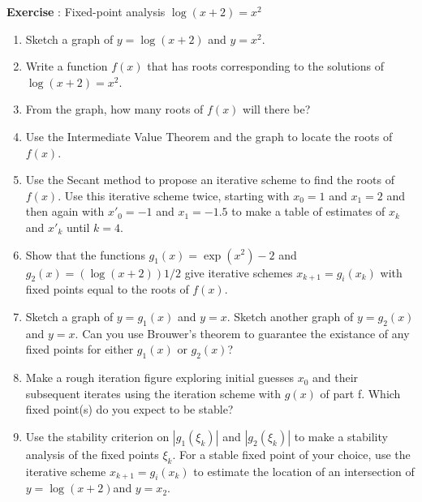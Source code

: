 \documentclass[a4paper,12pt,openany,notitlepage]{book}
\newcounter{num_exercice}
\newcommand{\exercice}
    {   \par
        \stepcounter{num_exercice}%
        \noindent
        \textbf{Exercise \arabic{num_exercice}}:
        \quad
    }
\begin{document}
\exercice{Fixed-point analysis $\log(x+2)=x^2$}
\begin{enumerate}[label=\alph*)]
	\item Sketch a graph of $y=\log(x+2)$ and $y=x^2$. 
	
	\item Write a function $f(x)$ that has roots corresponding to the solutions of $\log(x+2)=x^2$.
	
	\item From the graph, how many roots of $f(x)$ will there be?
	
	\item Use the Intermediate Value Theorem and the graph to locate the roots of $f(x)$.
	
	\item Use the Secant method to propose an iterative scheme to find the roots of $f(x)$. Use this iterative scheme twice, starting with $x_0=1$ and $x_1=2$ and then again with $x'_0=-1$ and $x_1=-1.5$ to make a table of estimates of $x_k$ and $x'_k$ until $k=4$.
	
	\item Show that the functions $g_1(x)=\exp(x^2)-2$ and $g_2(x)=( \log(x+2) )1/2$ give iterative schemes $x_{k+1} = g_i(x_k)$ with fixed points equal to the roots of $f(x)$.
	
	\item Sketch a graph of $y=g_1(x)$ and $y=x$. Sketch another graph of $y=g_2(x)$ and $y=x$. Can you use Brouwer's theorem to guarantee the existance of any fixed points for either $g_1(x)$ or $g_2(x)$?
	
	\item Make a rough iteration figure exploring initial guesses $x_0$ and their subsequent iterates using the iteration scheme with $g(x)$ of part f. Which fixed point(s) do you expect to be stable?
	
	\item Use the stability criterion on $|g_1(\xi_k)|$ and $|g_2(\xi_k)|$ to make a stability analysis of the fixed points $\xi_k$. For a stable fixed point of your choice, use the iterative scheme $x_{k+1}=g_i(x_k)$ to estimate the location of an intersection of $y=\log(x+2) $and $y=x_2$.
\end{enumerate}



\end{document}
